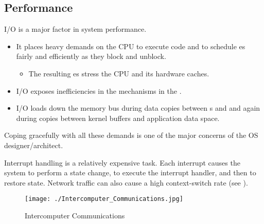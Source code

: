 \subsection{Performance}\label{subsec:IO_Subsystem_Performance}
I/O is a major factor in system performance.
\begin{itemize}[noitemsep]
\item It places heavy demands on the CPU to execute  code and to schedule es fairly and efficiently as they block and unblock.
  \begin{itemize}[noitemsep]
  \item The resulting es stress the CPU and its hardware caches.
\end{itemize}
\item I/O exposes inefficiencies in the  mechanisms in the .
\item I/O loads down the memory bus during data copies between s and  and again during copies between kernel buffers and application data space.
\end{itemize}

Coping gracefully with all these demands is one of the major concerns of the OS designer/architect.

Interrupt handling is a relatively expensive task.
Each interrupt causes the system to perform a state change, to execute the interrupt handler, and then to restore state.
Network traffic can also cause a high context-switch rate (see ).

\begin{figure}[h!tbp]
  \centering
  \texttt{[image: ./Intercomputer\_Communications.jpg]}
  \caption{Intercomputer Communications}
  \label{fig:Intercomputer_Communications}
\end{figure}

